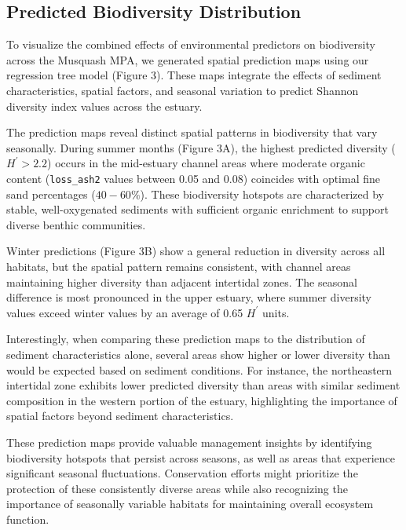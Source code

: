 \documentclass[12pt]{article}
\begin{document}
\subsection{Predicted Biodiversity Distribution}

\qquad To visualize the combined effects of environmental predictors on
biodiversity across the Musquash MPA, we generated spatial prediction maps using
our regression tree model (Figure 3). These maps integrate the effects of
sediment characteristics, spatial factors, and seasonal variation to predict
Shannon diversity index values across the estuary.


\qquad The prediction maps reveal distinct spatial patterns in biodiversity that
vary seasonally. During summer months (Figure 3A), the highest predicted
diversity ($H^{\prime} > 2.2$) occurs in the mid-estuary channel areas where
moderate organic content (\texttt{loss\_ash2} values between 0.05 and 0.08)
coincides with optimal fine sand percentages ($40-60\%$). These biodiversity
hotspots are characterized by stable, well-oxygenated sediments with sufficient
organic enrichment to support diverse benthic communities.

\qquad Winter predictions (Figure 3B) show a general reduction in diversity
across all habitats, but the spatial pattern remains consistent, with channel
areas maintaining higher diversity than adjacent intertidal zones. The seasonal
difference is most pronounced in the upper estuary, where summer diversity
values exceed winter values by an average of 0.65 $H^{\prime}$ units.

\qquad Interestingly, when comparing these prediction maps to the distribution
of sediment characteristics alone, several areas show higher or lower diversity
than would be expected based on sediment conditions. For instance, the
northeastern intertidal zone exhibits lower predicted diversity than areas with
similar sediment composition in the western portion of the estuary, highlighting
the importance of spatial factors beyond sediment characteristics.

\qquad These prediction maps provide valuable management insights by identifying
biodiversity hotspots that persist across seasons, as well as areas that
experience significant seasonal fluctuations. Conservation efforts might
prioritize the protection of these consistently diverse areas while also
recognizing the importance of seasonally variable habitats for maintaining
overall ecosystem function.
\end{document}
